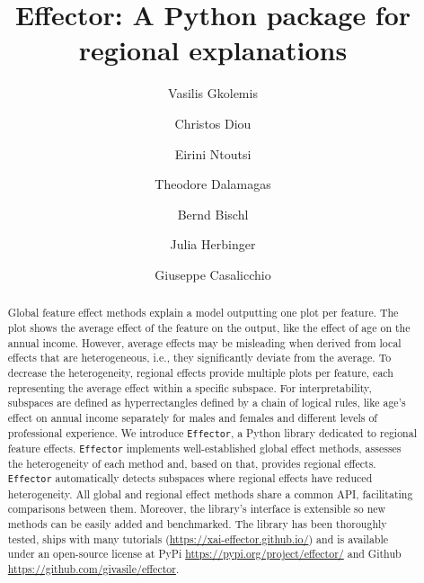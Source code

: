 \documentclass[
twocolumn,
]{ceurart}
\begin{document}


\title{Effector: A Python package for regional explanations}

\author[1,2]{Vasilis Gkolemis}
\address[1]{Harokopio University of Athens}
\address[2]{ATHENA Research Center}
\author[1]{Christos Diou}
\author[3]{Eirini Ntoutsi}
\address[3]{University of the Bundeswehr Munich}
\author[2]{Theodore Dalamagas}
\author[4]{Bernd Bischl}
\address[4]{Munich Center for Machine Learning (MCML), Department of Statistics, LMU Munich}
\author[4]{Julia Herbinger}
\author[4]{Giuseppe Casalicchio}


\begin{abstract}
Global feature effect methods explain a model outputting one plot per feature. The plot shows the average effect of the feature on the output, like the effect of age on the annual income.  However, average effects may be misleading when derived from local effects that are heterogeneous, i.e., they significantly deviate from the average.  To decrease the heterogeneity, regional effects provide multiple plots per feature, each representing the average effect within a specific subspace.  For interpretability, subspaces are defined as hyperrectangles defined by a chain of logical rules, like age's effect on annual income separately for males and females and different levels of professional experience.  We introduce \texttt{Effector}, a Python library dedicated to regional feature effects.  \texttt{Effector} implements well-established global effect methods, assesses the heterogeneity of each method and, based on that, provides regional effects. \texttt{Effector} automatically detects subspaces where regional effects have reduced heterogeneity.  All global and regional effect methods share a common API, facilitating comparisons between them. Moreover, the library's interface is extensible so new methods can be easily added and benchmarked. The library has been thoroughly tested, ships with many tutorials (\href{https://xai-effector.github.io/}{https://xai-effector.github.io/}) and is available under an open-source license at PyPi \href{https://pypi.org/project/effector/}{https://pypi.org/project/effector/} and Github \href{https://github.com/givasile/effector}{https://github.com/givasile/effector}.
\end{abstract}
\end{document}
